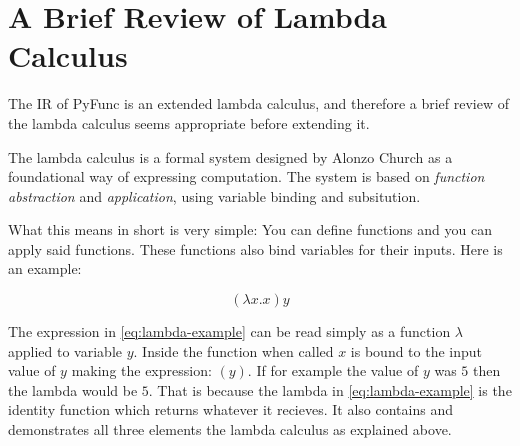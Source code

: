 \documentclass{l4proj}
\begin{document}







\section{A Brief Review of Lambda Calculus} \label{sec:lambda-review}

The IR of PyFunc is an extended lambda calculus, and therefore a brief review of the lambda calculus seems appropriate before extending it.

The lambda calculus is a formal system designed by Alonzo Church as a foundational way of expressing computation.
The system is based on \emph{function abstraction} and \emph{application}, using variable binding and subsitution.

What this means in short is very simple: You can define functions and you can apply said functions.
These functions also bind variables for their inputs.
Here is an example: 

\begin{equation} \label{eq:lambda-example}
    (\lambda x . x) y
\end{equation}

The expression in \ref{eq:lambda-example} can be read simply as a function $\lambda$ applied to variable $y$.
Inside the function when called $x$ is bound to the input value of $y$ making the expression: $(y)$.
If for example the value of $y$ was $5$ then the lambda would be $5$.
That is because the lambda in \ref{eq:lambda-example} is the identity function which returns whatever it recieves.
It also contains and demonstrates all three elements the lambda calculus as explained above.
\end{document}
